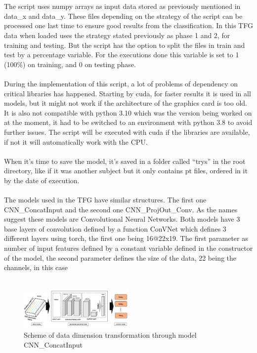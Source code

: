 \leavevmode\\
\\
The script uses numpy arrays as input data stored as previously mentioned in data\_x and data\_y. These files depending on the strategy of the script can be processed one last time to ensure good results from the classification. In this TFG data when loaded uses the strategy stated previously as phase 1 and 2, for training and testing. But the script has the option to split the files in train and test by a percentage variable. For the executions done this variable is set to 1 (100\%) on training, and 0 on testing phase.
\\\\
During the implementation of this script, a lot of problems of dependency on critical libraries has happened. Starting by cuda, for faster results it is used in all models, but it might not work if the architecture of the graphics card is too old. It is also not compatible with python 3.10 which was the version being worked on at the moment, it had to be switched to an environment with python 3.8 to avoid further issues. The script will be executed with cuda if the libraries are available, if not it will automatically work with the CPU.
\\\\
When it’s time to save the model, it’s saved in a folder called “trys” in the root directory, like if it was another subject but it only contains pt files, ordered in it by the date of execution.
\\\\
The models used in the TFG have similar structures. The first one CNN\_ConcatInput and the second one CNN\_ProjOut\_Conv. As the names suggest these models are Convolutional Neural Networks. Both models have 3 base layers of convolution defined by a function ConVNet which defines 3 different layers using torch, the first one being 16@22x19. The first parameter as number of input features defined by a constant variable defined in the constructor of the model, the second parameter defines the size of the data, 22 being the channels, in this case 
\\
\leavevmode\\
\begin{figure}[h!]
  \caption{Scheme of data dimension transformation through model CNN\_ConcatInput}
  \centering
  \includegraphics[width=0.5\textwidth]{img/FeatureProjectorModel CHM.png}
\end{figure}
